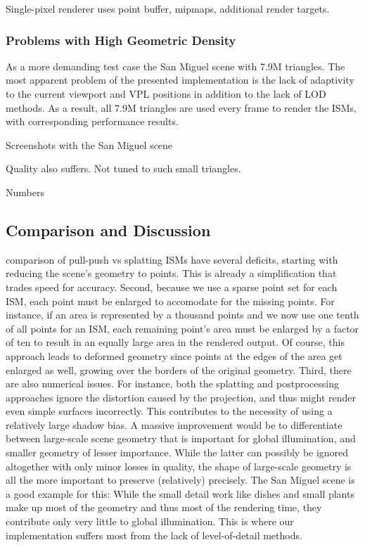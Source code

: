Single-pixel renderer uses point buffer, mipmaps, additional render targets.


\subsubsection{Problems with High Geometric Density}

As a more demanding test case the San Miguel scene with 7.9M triangles. The most apparent problem of the presented implementation is the lack of adaptivity to the current viewport and VPL positions in addition to the lack of LOD methods. As a result, all 7.9M triangles are used every frame to render the ISMs, with corresponding performance results.

Screenshots with the San Miguel scene

Quality also suffers. Not tuned to such small triangles.

Numbers

\subsection{Comparison and Discussion}
\begin{outline}
    \1 comparison of pull-push vs splatting
    \1 ISMs have several deficits, starting with reducing the scene's geometry to points. This is already a simplification that trades speed for accuracy.
    \1 Second, because we use a sparse point set for each ISM, each point must be enlarged to accomodate for the missing points. For instance, if an area is represented by a thousand points and we now use one tenth of all points for an ISM, each remaining point's area must be enlarged by a factor of ten to result in an equally large area in the rendered output. Of course, this approach leads to deformed geometry since points at the edges of the area get enlarged as well, growing over the borders of the original geometry.
    \1 Third, there are also numerical issues. For instance, both the splatting and postprocessing approaches ignore the distortion caused by the projection, and thus might render even simple surfaces incorrectly. This contributes to the necessity of using a relatively large shadow bias.
    \1 A massive improvement would be to differentiate between large-scale scene geometry that is important for global illumination, and smaller geometry of lesser importance. While the latter can possibly be ignored altogether with only minor losses in quality, the shape of large-scale geometry is all the more important to preserve (relatively) precisely.
    \1 The San Miguel scene is a good example for this: While the small detail work like dishes and small plants make up most of the geometry and thus most of the rendering time, they contribute only very little to global illumination. This is where our implementation suffers most from the lack of level-of-detail methods.
\end{outline}



